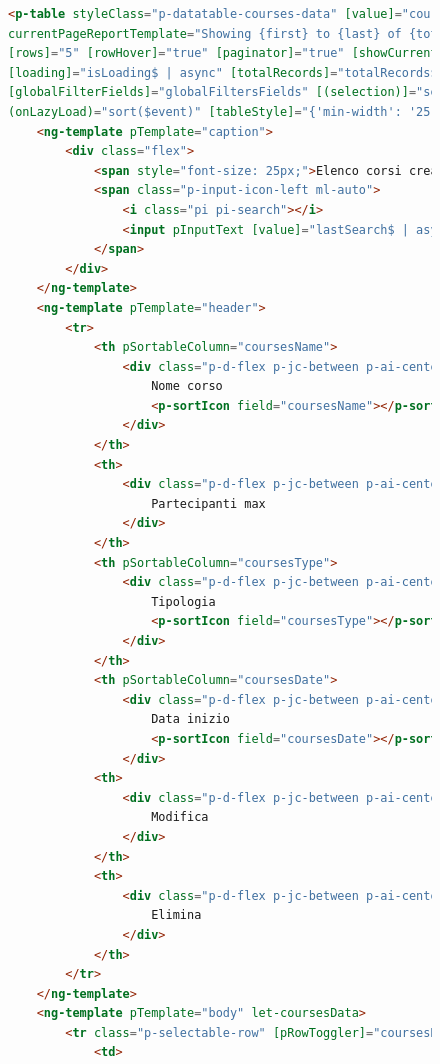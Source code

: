 \begin{figure}[H]
\centering
\begin{lstlisting}[language=HTML, linewidth=20cm, basicstyle=\tiny]
<p-table styleClass="p-datatable-courses-data" [value]="coursesData$ | async" dataKey="chargePointId"
currentPageReportTemplate="Showing {first} to {last} of {totalRecords} entries" responsiveLayout="scroll"
[rows]="5" [rowHover]="true" [paginator]="true" [showCurrentPageReport]="true" [rowsPerPageOptions]="[5,10,15]"
[loading]="isLoading$ | async" [totalRecords]="totalRecords$ | async" [filterDelay]="300"
[globalFilterFields]="globalFiltersFields" [(selection)]="selectedCoursesData" [lazy]="true" [customSort]="true"
(onLazyLoad)="sort($event)" [tableStyle]="{'min-width': '25rem'}">
    <ng-template pTemplate="caption">
        <div class="flex">
            <span style="font-size: 25px;">Elenco corsi creati</span>
            <span class="p-input-icon-left ml-auto">
                <i class="pi pi-search"></i>
                <input pInputText [value]="lastSearch$ | async" type="text" (input)="filter($event.target.value)" placeholder="Course Search" />
            </span>
        </div>
    </ng-template>
    <ng-template pTemplate="header">
        <tr>
            <th pSortableColumn="coursesName">
                <div class="p-d-flex p-jc-between p-ai-center">
                    Nome corso
                    <p-sortIcon field="coursesName"></p-sortIcon>
                </div>
            </th>
            <th>
                <div class="p-d-flex p-jc-between p-ai-center">
                    Partecipanti max
                </div>
            </th>
            <th pSortableColumn="coursesType">
                <div class="p-d-flex p-jc-between p-ai-center">
                    Tipologia
                    <p-sortIcon field="coursesType"></p-sortIcon>
                </div>
            </th>
            <th pSortableColumn="coursesDate">
                <div class="p-d-flex p-jc-between p-ai-center">
                    Data inizio
                    <p-sortIcon field="coursesDate"></p-sortIcon>
                </div>
            <th>
                <div class="p-d-flex p-jc-between p-ai-center">
                    Modifica
                </div>
            </th>
            <th>
                <div class="p-d-flex p-jc-between p-ai-center">
                    Elimina
                </div>
            </th>
        </tr>
    </ng-template>
    <ng-template pTemplate="body" let-coursesData>
        <tr class="p-selectable-row" [pRowToggler]="coursesData.coursesId">
            <td>

\end{lstlisting}
\end{figure}

